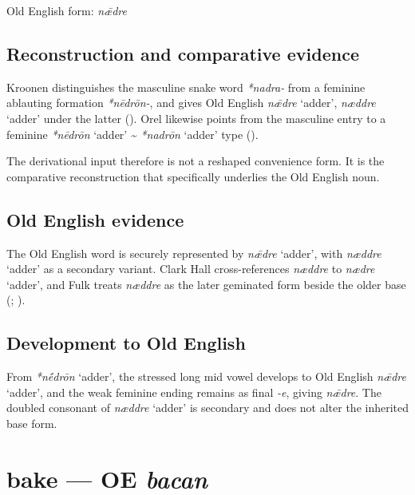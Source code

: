 \documentclass[
  british,
  a4paper,
  openany]{book}
\providecommand{\Recon}[1]{\emph{*#1}}
{\catcode`→=\active \global\def→{\ensuremath{\rightarrow}}}
\providecommand{\texorpdfstring}[2]{#1}
\providecommand{\Recon}[1]{\emph{*#1}}
{\catcode`→=\active \global\def→{\ensuremath{\rightarrow}}}
\begin{document}
Old English form: \emph{nǣdre}

\subsection{Reconstruction and comparative
evidence}\label{reconstruction-and-comparative-evidence}

Kroonen distinguishes the masculine snake word {\emph{*nadra-}} from a
feminine ablauting formation {\emph{*nēdrōn-}}, and gives Old English
{\emph{nǣdre}} `adder', {\emph{næddre}} `adder' under the latter
(). Orel likewise points
from the masculine entry to a feminine {\Recon{nēdrōn} `adder'}
\textasciitilde{} {\Recon{nadrōn} `adder'} type
().

The derivational input therefore is not a reshaped convenience form. It
is the comparative reconstruction that specifically underlies the Old
English noun.

\subsection{Old English evidence}\label{old-english-evidence}

The Old English word is securely represented by {\emph{nǣdre}} `adder',
with {\emph{næddre}} `adder' as a secondary variant. Clark Hall
cross-references {\emph{næddre}} to {\emph{nædre}} `adder', and Fulk
treats {\emph{næddre}} as the later geminated form beside the older base
(;
).

\subsection{Development to Old
English}\label{development-to-old-english}

From {\Recon{nḗdrōn} `adder'}, the stressed long mid vowel develops to
Old English {\emph{nǣdre}} `adder', and the weak feminine ending remains
as final \emph{-e}, giving {\emph{nǣdre}}. The doubled consonant of
{\emph{næddre}} `adder' is secondary and does not alter the inherited
base form.

\section{\texorpdfstring{bake --- OE
\emph{bacan}}{bake --- OE bacan}}\label{bake-oe-bacan}
\end{document}
